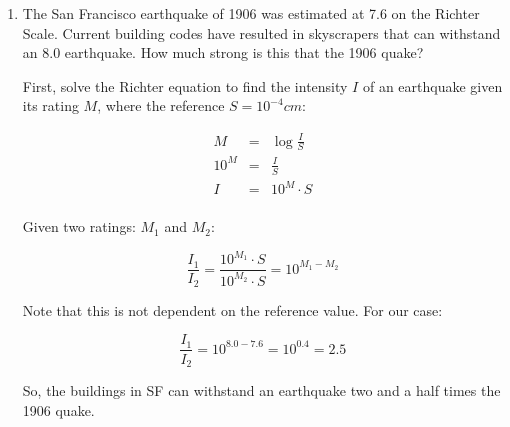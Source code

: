 \documentclass[letterpaper,12pt,fleqn]{article}
\begin{document}
\begin{enumerate}
\item The San Francisco earthquake of 1906 was estimated at 7.6 on the Richter
Scale. Current building codes have resulted in skyscrapers that can withstand
an 8.0 earthquake. How much strong is this that the 1906 quake?

\bigskip

First, solve the Richter equation to find the intensity $I$ of an earthquake
given its rating $M$, where the reference $S=10^{-4}cm$:

\begin{eqnarray*}
M &=& \log{\frac{I}{S}} \\
10^M &=& \frac{I}{S} \\
I &=& 10^M\cdot S \\
\end{eqnarray*}

Given two ratings: $M_1$ and $M_2$:

\[\frac{I_1}{I_2}=\frac{10^{M_1}\cdot S}{10^{M_2}\cdot S}=10^{M_1-M_2}\]

Note that this is not dependent on the reference value.  For our case:

\[\frac{I_1}{I_2}=10^{8.0-7.6}=10^{0.4}=2.5\]

So, the buildings in SF can withstand an earthquake two and a half times the
1906 quake.
\end{enumerate}
\end{document}

